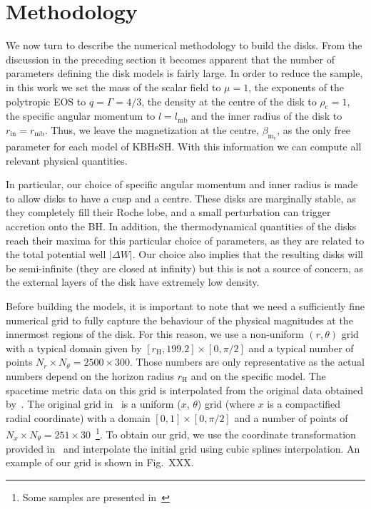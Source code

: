 \documentclass[twocolumn,aps,showpacs,showkeys,prd,superscriptaddress,byrevtex, amsmath]{revtex4-1}
\begin{document}
\section{Methodology}
\label{procedure}

We now turn to describe the numerical methodology to build the disks. From the discussion in the preceding section it becomes apparent that the number of parameters defining the disk models is fairly large. In order to reduce the sample, in this work we set the mass of the scalar field to $\mu = 1$, the exponents of the polytropic EOS to $q = \Gamma = 4/3$, the density at the centre of the disk to $\rho_{\mathrm{c}} = 1$, the specific angular momentum to $l = l_{\mathrm{mb}}$ and the inner radius of the disk to $r_{\mathrm{in}} = r_{\mathrm{mb}}$. Thus, we leave the magnetization at the centre, $\beta_{\mathrm{m_c}}$, as the only free parameter for each model of KBHsSH. With this information we can compute all relevant physical quantities.

In particular, our choice of specific angular momentum and inner radius is made to allow disks to have a cusp and a centre. These disks are marginally stable, as they completely fill their Roche lobe, and a small perturbation can trigger accretion onto the BH. In addition, the thermodynamical quantities of the disks reach their maxima for this particular choice of parameters, as they are related to the total potential well $|\Delta W|$. Our choice also implies that the resulting disks will be semi-infinite (they are closed at infinity) but this is not a source of concern, as the external layers of the disk have extremely low density.

Before building the models, it is important to note that we need a sufficiently fine numerical grid to fully capture the behaviour of the physical magnitudes at the innermost regions of the disk. For this reason, we use a non-uniform $(r, \theta)$ grid with a typical domain given by $[r_{\mathrm{H}}, 199.2] \times [0, \pi/2]$ and a typical number of points $N_r \times N_{\theta} = 2500 \times 300$. Those numbers are only representative as the actual numbers depend on the horizon radius $r_{\mathrm{H}}$ and on the specific model. The spacetime metric data on this grid is interpolated from the original data obtained by~\cite{Herdeiro:2015b}. The original grid in~\cite{Herdeiro:2015b} is a uniform ($x$, $\theta$) grid (where $x$ is a compactified radial coordinate) with a domain $[0, 1] \times [0, \pi/2]$ and a number of points of $N_x \times N_{\theta} = 251 \times 30$~\footnote{Some samples are presented in~\cite{grav_web}}. To obtain our grid, we use the coordinate transformation provided in~\cite{grav_web} and interpolate the initial grid using cubic splines interpolation. An example of our grid is shown in Fig.~XXX.  
\end{document}
